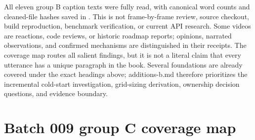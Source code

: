 All eleven group B caption texts were fully read, with canonical word counts and cleaned-file hashes saved in . This is not frame-by-frame review, source checkout, build reproduction, benchmark verification, or current API research. Some videos are reactions, code reviews, or historic roadmap reports; opinions, narrated observations, and confirmed mechanisms are distinguished in their receipts. The coverage map routes all salient findings, but it is not a literal claim that every utterance has a unique paragraph in the book. Several foundations are already covered under the exact headings above; additions-b.md therefore prioritizes the incremental cold-start investigation, grid-sizing derivation, ownership decision questions, and evidence boundary.

\section{Batch 009 group C coverage map}\label{appendix-877738f6f4d2-batch-009-group-c-coverage-map}

\hypertarget{appendix-877738f6f4d2-batch-009-group-c-coverage-map}{}

